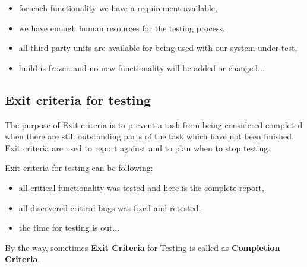     \begin{itemize}
\item 
for each functionality we have a requirement available,
\item 
    we have enough human resources for the testing process,
\item 
    all third-party units are available for being used with our system under test,
\item 
    build is frozen and no new functionality will be added or changed...                                                                        \end{itemize}


\subsection{Exit criteria for testing}
\label{sec:Exit criteria for testing}

 The purpose of Exit criteria is to prevent a task from being considered completed when there are still outstanding parts of the task which have not been finished. Exit criteria are used to report against and to plan when to stop testing. 

Exit criteria for testing can be following:

    \begin{itemize}
\item     all critical functionality was tested and here is the complete report,
\item     all discovered critical bugs was fixed and retested,
\item     the time for testing is out...\end{itemize}

By the way, sometimes \textbf{Exit Criteria} for Testing is called as \textbf{Completion Criteria}.
